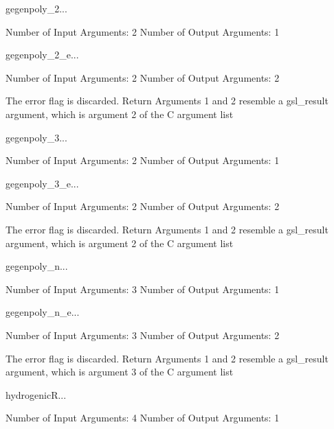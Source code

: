 \begin{funcdesc}{gegenpoly_2}{...}

    Number of Input  Arguments:  2
    Number of Output Arguments:  1
\end{funcdesc}

\begin{funcdesc}{gegenpoly_2_e}{...}

    Number of Input  Arguments:  2
    Number of Output Arguments:  2

The error flag is discarded.
Return Arguments 1 and 2 resemble a gsl_result argument,
	which is  argument 2 of the C argument list

\end{funcdesc}

\begin{funcdesc}{gegenpoly_3}{...}

    Number of Input  Arguments:  2
    Number of Output Arguments:  1
\end{funcdesc}

\begin{funcdesc}{gegenpoly_3_e}{...}

    Number of Input  Arguments:  2
    Number of Output Arguments:  2

The error flag is discarded.
Return Arguments 1 and 2 resemble a gsl_result argument,
	which is  argument 2 of the C argument list

\end{funcdesc}

\begin{funcdesc}{gegenpoly_n}{...}

    Number of Input  Arguments:  3
    Number of Output Arguments:  1
\end{funcdesc}

\begin{funcdesc}{gegenpoly_n_e}{...}

    Number of Input  Arguments:  3
    Number of Output Arguments:  2

The error flag is discarded.
Return Arguments 1 and 2 resemble a gsl_result argument,
	which is  argument 3 of the C argument list

\end{funcdesc}

\begin{funcdesc}{hydrogenicR}{...}

    Number of Input  Arguments:  4
    Number of Output Arguments:  1
\end{funcdesc}

